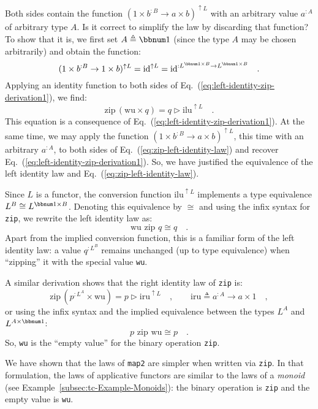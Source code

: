 Both sides contain the function $(1\times b^{:B}\rightarrow a\times b)^{\uparrow L}$
with an arbitrary value $a^{:A}$ of arbitrary type $A$. Is it correct
to simplify the law by discarding that function? To show that it is,
we first set $A\triangleq\bbnum 1$ (since the type $A$ may be chosen
arbitrarily) and obtain the function:
\[
(1\times b^{:B}\rightarrow1\times b)^{\uparrow L}=\text{id}^{\uparrow L}=\text{id}^{:L^{\bbnum 1\times B}\rightarrow L^{\bbnum 1\times B}}\quad.
\]
Applying an identity function to both sides of Eq.~(\ref{eq:left-identity-zip-derivation1}),
we find:
\begin{equation}
\text{zip}\,(\text{wu}\times q)=q\triangleright\text{ilu}^{\uparrow L}\quad.\label{eq:zip-left-identity-law}
\end{equation}
This equation is a consequence of Eq.~(\ref{eq:left-identity-zip-derivation1}).
At the same time, we may apply the function $(1\times b^{:B}\rightarrow a\times b)^{\uparrow L}$,
this time with an arbitrary $a^{:A}$, to both sides of Eq.~(\ref{eq:zip-left-identity-law})
and recover Eq.~(\ref{eq:left-identity-zip-derivation1}). So, we
have justified the equivalence of the left identity law and Eq.~(\ref{eq:zip-left-identity-law}).

Since $L$ is a functor, the conversion function $\text{ilu}^{\uparrow L}$
implements a type equivalence $L^{B}\cong L^{\bbnum 1\times B}$.
Denoting this equivalence by $\cong$ and using the infix syntax for
\lstinline!zip!, we rewrite the left identity law as:
\[
\text{wu}\,\,\text{zip}\,\,q\cong q\quad.
\]
Apart from the implied conversion function, this is a familiar form
of the left identity law: a value $q^{:L^{B}}$ remains unchanged
(up to type equivalence) when \textsf{``}zipping\textsf{''} it with the special value
\lstinline!wu!.

A similar derivation shows that the right identity law of \lstinline!zip!
is:
\[
\text{zip}\,(p^{:L^{A}}\times\text{wu})=p\triangleright\text{iru}^{\uparrow L}\quad,\quad\quad\text{iru}\triangleq a^{:A}\rightarrow a\times1\quad,
\]
or using the infix syntax and the implied equivalence between the
types $L^{A}$ and $L^{A\times\bbnum 1}$:
\[
p\,\,\text{zip}\,\,\text{wu}\cong p\quad.
\]
So, \lstinline!wu! is the \textsf{``}empty value\textsf{''} for the binary operation
\lstinline!zip!.

We have shown that the laws of \lstinline!map2! are simpler when
written via \lstinline!zip!. In that formulation, the laws of applicative
functors are similar to the laws of a \emph{monoid}
(see Example~\ref{subsec:tc-Example-Monoids}): the binary operation
is \lstinline!zip! and the empty value is \lstinline!wu!. 

